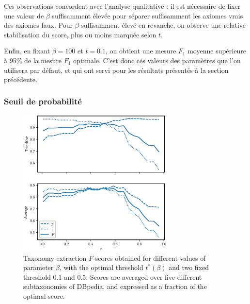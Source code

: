 Ces observations concordent avec l'analyse qualitative : il est nécessaire de fixer une valeur de $\beta$ suffisamment élevée pour séparer suffisamment les axiomes vrais des axiomes faux. Pour $\beta$ suffisamment élevé en revanche, on observe une relative stabilisation du score, plus ou moins marquée selon $t$. 

Enfin, en fixant $\beta = 100$ et $t=0.1$, on obtient une mesure $F_1$ moyenne supérieure à 95\% de la mesure $F_1$ optimale. C'est donc ces valeurs des paramètres que l'on utilisera par défaut, et qui ont servi pour les résultats présentés à la section précédente.


\subsubsection{Seuil de probabilité}

\begin{figure}[h]
    \centering
    \includegraphics[width=0.7\textwidth]{fig/plot/threshold_exp.eps}
    \caption[Influence du paramètre $t$]{
    Taxonomy extraction $F$-scores obtained for different values of parameter $\beta$, with the optimal threshold $t^*(\beta)$ and two fixed threshold $0.1$ and $0.5$. Scores are averaged over five different subtaxonomies of DBpedia, and expressed as a fraction of the optimal score.}
    \label{fig:beta-search-2}
\end{figure}

